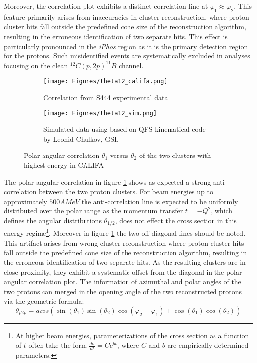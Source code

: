 Moreover, the correlation plot exhibits a distinct correlation line at $\varphi_1 \approx \varphi_2$. This feature primarily arises from inaccuracies in cluster reconstruction, where proton cluster hits fall outside the predefined cone size of the reconstruction algorithm, resulting in the erroneous identification of two separate hits. This effect is particularly pronounced in the \textit{iPhos} region as it is the primary detection region for the protons. Such misidentified events are systematically excluded in analyses focusing on the clean $^{12}C(p,2p)^{11}B$ channel.\newline
\begin{figure}[htpb]
	\begin{subfigure}[t]{.75\linewidth}
    \texttt{[image: Figures/theta12\_califa.png]}
	\caption{Correlation from S444 experimental data}
	\end{subfigure}
	\begin{subfigure}[t]{.75\linewidth}
    \texttt{[image: Figures/theta12\_sim.png]}
	\caption{Simulated data using based on QFS kinematical code by Leonid Chulkov, GSI.}
	\end{subfigure}
    \caption{Polar angular correlation $\theta_1$ versus $\theta_2$ of the two clusters with highest energy in CALIFA }
    \label{fig:polar_corr}
\end{figure}
The polar angular correlation in figure \ref{fig:polar_corr} shows as expected a strong anti-correlation between the two proton clusters. For beam energies up to approximately $500 AMeV$ the anti-correlation line is expected to be uniformly distributed over the polar range as the momentum transfer $t = -Q^2$, which defines the angular distributions $\theta_{1/2}$, does not effect the cross section in this energy regime\footnote{At higher beam energies, parameterizations of the cross section as a function of $t$ often take the form $\frac{d\sigma}{dt} = C e^{bt}$, where $C$ and $b$ are empirically determined parameters.}.\newline
Moreover in figure \ref{fig:polar_corr} the two off-diagonal lines should be noted. This artifact arises from wrong cluster reconstruction where proton cluster hits fall outside the predefined cone size of the reconstruction algorithm, resulting in the erroneous identification of two separate hits. As the resulting clusters are in close proximity, they exhibit a systematic offset from the diagonal in the polar angular correlation plot.\newline
The information of azimuthal and polar angles of the two protons can merged in the opening angle of the two reconstructed protons via the geometric formula:
\begin{equation}\label{eq:opang}
\theta_{p2p} = acos\left( \sin(\theta_1) \sin(\theta_2) \cos(\varphi_2 - \varphi_1) + \cos(\theta_1) \cos(\theta_2) \right)
\end{equation}

